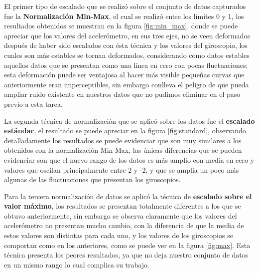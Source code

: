 \vspace{5mm} %

El primer tipo de escalado que se realiz\'{o} sobre el conjunto de datos capturados fue la \textbf{Normalizaci\'{o}n Min-Max}, el cual se realiz\'{o} entre los l\'{i}mites 0 y 1, los resultados obtenidos se muestran en la figura \ref{fig:min_max}, donde se puede apreciar que los valores del aceler\'{o}metro, en sus tres ejes, no se veen deformados despu\'{e}s de haber sido escalados con \'{e}sta t\'{e}cnica y los valores del giroscopio, los cuales son m\'{a}s estables se tornan deformados, considerando como datos estables aquellos datos que se presentan como una l\'{i}nea en cero con pocas fluctuaciones; esta deformaci\'{o}n puede ser ventajosa al hacer m\'{a}s visible peque\~{n}as curvas que anteriormente eran imperceptibles, sin embargo conlleva el peligro de que pueda ampliar ruido existente en nuestros datos que no pudimos eliminar en el paso previo a esta tarea.


\vspace{5mm} %

La segunda t\'{e}cnica de normalizaci\'{o}n que se aplic\'{o} sobre los datos fue el \textbf{escalado est\'{a}ndar}, el resultado se puede apreciar en la figura \ref{fig:standard}, observando detalladamente los resultados se puede evidenciar que son muy similares a los obtenidos con la normalizaci\'{o}n Min-Max, las \'{u}nicas diferencias que se pueden evidenciar son que el nuevo rango de los datos es m\'{a}s amplio con media en cero y valores que oscilan principalmente entre 2 y -2,  y que se amplia un poco m\'{a}s algunas de las fluctuaciones que presentan los giroscopios.

\vspace{5mm} %

Para la tercera normalizaci\'{o}n de datos se aplic\'{o} la t\'{e}cnica de \textbf{escalado sobre el valor m\'{a}ximo}, los resultados se presentan totalmente diferentes a los que se obtuvo anteriormente, sin embargo se observa claramente que los valores del aceler\'{o}metro no presentan mucho cambio, con la diferencia de que la media de estos valores son distintas para cada uno, y los valores de los giroscopios se comportan como en los anteriores, como se puede ver en la figura \ref{fig:max}. Esta t\'{e}cnica presenta los peores resultados, ya que no deja nuestro conjunto de datos en un mismo rango lo cual complica su trabajo.

\vspace{5mm} %

